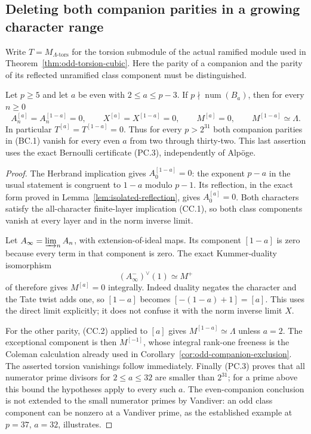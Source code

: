 \subsection{Deleting both companion parities in a growing character range}
\label{sec:growing-component-window}

Write $T=M_{\Lambda\text{-tors}}$ for the torsion submodule of the
actual ramified module used in Theorem~\ref{thm:odd-torsion-cubic}.
Here the parity of a companion and the parity of its reflected
unramified class component must be distinguished.

\begin{proposition}
\label{prop:both-companions}
Let $p\geq5$ and let $a$ be even with $2\leq a\leq p-3$.
If $p\nmid\operatorname{num}(B_a)$, then for every $n\geq0$
\[
 A_n^{[a]}=A_n^{[1-a]}=0,\qquad
 X^{[a]}=X^{[1-a]}=0,\qquad
 M^{[a]}=0,\qquad M^{[1-a]}\simeq\Lambda.
 \tag{BC.1}
\]
In particular $T^{[a]}=T^{[1-a]}=0$. Thus for every
$p>2^{31}$ both companion parities in (BC.1) vanish for every
even $a$ from two through thirty-two. This last assertion uses
the exact Bernoulli certificate (PC.3), independently of Alp\"oge.
\end{proposition}

\begin{proof}
The Herbrand implication gives $A_0^{[1-a]}=0$:
the exponent $p-a$ in the usual statement is congruent to
$1-a$ modulo $p-1$. Its reflection, in the exact form proved
in Lemma~\ref{lem:isolated-reflection}, gives $A_0^{[a]}=0$.
Both characters satisfy the all-character finite-layer implication
(CC.1), so both class components vanish at every layer and in
the norm inverse limit.

Let $A_\infty=\varinjlim_n A_n$, with extension-of-ideal maps.
Its component $[1-a]$ is zero because every term in that
component is zero. The exact Kummer-duality isomorphism
\[
                    (A_\infty^-)^\vee(1)\simeq M^+
\]
of \cite[Proposition~3.4.7 and its proof, p.~92]{SharifiIwasawaFull2026}
therefore gives $M^{[a]}=0$ integrally. Indeed duality negates
the character and the Tate twist adds one, so $[1-a]$ becomes
$[-(1-a)+1]=[a]$. This uses the direct limit explicitly;
it does not confuse it with the norm inverse limit $X$.

For the other parity, (CC.2) applied to $[a]$ gives
$M^{[1-a]}\simeq\Lambda$ unless $a=2$. The exceptional
component is then $M^{[-1]}$, whose integral rank-one
freeness is the Coleman calculation already used in
Corollary~\ref{cor:odd-companion-exclusion}.
The asserted torsion vanishings follow immediately.
Finally (PC.3) proves that all numerator prime divisors for
$2\leq a\leq32$ are smaller than $2^{31}$; for a prime above
this bound the hypotheses apply to every such $a$.
The even-companion conclusion is not extended to the small
numerator primes by Vandiver: an odd class component can be
nonzero at a Vandiver prime, as the established example at
$p=37$, $a=32$, illustrates.
\end{proof}

